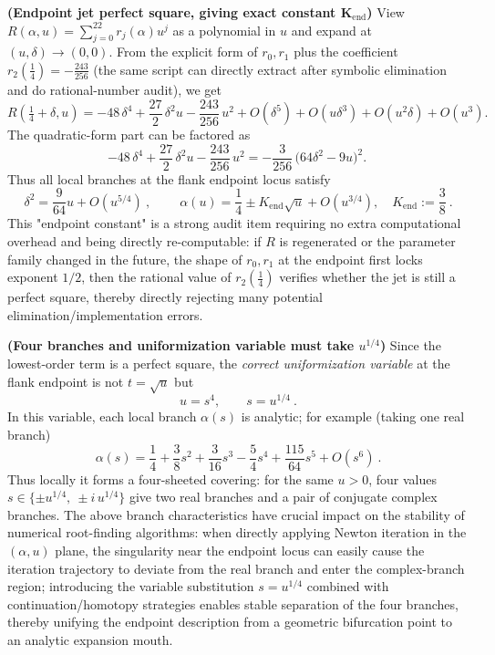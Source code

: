 \begin{remark}[Structure of the elimination curve: dual symmetry, endpoint singular loci, and \texorpdfstring{$\alpha=\tfrac12$}{alpha=1/2} aggregation fingerprint]
\par
\noindent\textbf{(Endpoint jet perfect square, giving exact constant \(\boldsymbol{K_{\mathrm{end}}}\))}
View \(R(\alpha,u)=\sum_{j=0}^{22}r_j(\alpha)u^j\) as a polynomial in \(u\) and expand at \((u,\delta)\to(0,0)\).
From the explicit form of \(r_0,r_1\) plus the coefficient \(r_2(\tfrac14)=-\tfrac{243}{256}\) (the same script can directly extract after symbolic elimination and do rational-number audit), we get
\[
R\!\left(\tfrac14+\delta,u\right)
=-48\,\delta^4+\frac{27}{2}\,\delta^2u-\frac{243}{256}\,u^2
+O(\delta^5)+O(u\delta^3)+O(u^2\delta)+O(u^3).
\]
The quadratic-form part can be factored as
\[
-48\,\delta^4+\frac{27}{2}\,\delta^2u-\frac{243}{256}\,u^2
=-\frac{3}{256}\,\bigl(64\delta^2-9u\bigr)^2.
\]
Thus all local branches at the flank endpoint locus satisfy
\[
\boxed{\ \delta^2=\frac{9}{64}u+O(u^{5/4})\ },
\qquad
\boxed{\ \alpha(u)=\frac14\pm K_{\mathrm{end}}\sqrt{u}+O(u^{3/4}),\quad K_{\mathrm{end}}:=\frac{3}{8}\ }.
\]
This "endpoint constant" is a strong audit item requiring no extra computational overhead and being directly re-computable: if \(R\) is regenerated or the parameter family changed in the future, the shape of \(r_0,r_1\) at the endpoint first locks exponent \(1/2\), then the rational value of \(r_2(\tfrac14)\) verifies whether the jet is still a perfect square, thereby directly rejecting many potential elimination/implementation errors.
\par
\noindent\textbf{(Four branches and uniformization variable must take \(u^{1/4}\))}
Since the lowest-order term is a perfect square, the \emph{correct uniformization variable} at the flank endpoint is not \(t=\sqrt{u}\) but
\[
\boxed{\ u=s^4,\qquad s=u^{1/4}\ }.
\]
In this variable, each local branch \(\alpha(s)\) is analytic; for example (taking one real branch)
\[
\boxed{\ \alpha(s)=\frac14+\frac38 s^2+\frac{3}{16}s^3-\frac54 s^4+\frac{115}{64}s^5+O(s^6)\ }.
\]
Thus locally it forms a four-sheeted covering: for the same \(u>0\), four values \(s\in\{\pm u^{1/4},\ \pm i\,u^{1/4}\}\) give two real branches and a pair of conjugate complex branches.
The above branch characteristics have crucial impact on the stability of numerical root-finding algorithms: when directly applying Newton iteration in the \((\alpha,u)\) plane, the singularity near the endpoint locus can easily cause the iteration trajectory to deviate from the real branch and enter the complex-branch region; introducing the variable substitution \(s=u^{1/4}\) combined with continuation/homotopy strategies enables stable separation of the four branches, thereby unifying the endpoint description from a geometric bifurcation point to an analytic expansion mouth.

\end{remark}
